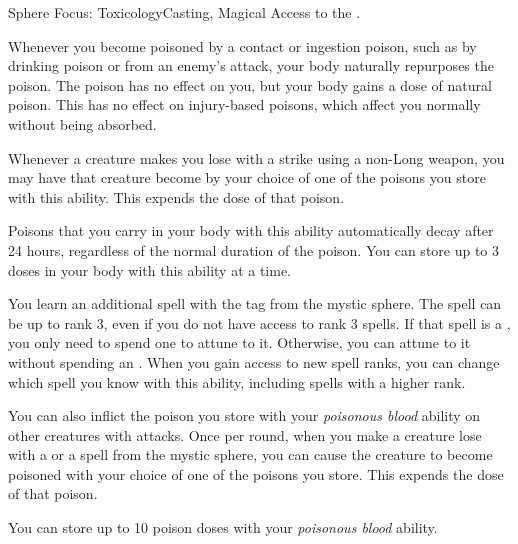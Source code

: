     \begin{magicalfeat}{Sphere Focus: Toxicology}{Casting, Magical}
        \featpre Access to the  .

         Whenever you become poisoned by a contact or ingestion poison, such as by drinking poison or from an enemy's attack, your body naturally repurposes the poison.
        The poison has no effect on you, but your body gains a dose of natural poison.
        This has no effect on injury-based poisons, which affect you normally without being absorbed.

        Whenever a creature makes you lose  with a  strike using a non-Long weapon, you may have that creature become  by your choice of one of the poisons you store with this ability.
        This expends the dose of that poison.

        Poisons that you carry in your body with this ability automatically decay after 24 hours, regardless of the normal duration of the poison.
        You can store up to 3 doses in your body with this ability at a time.

         You learn an additional spell with the  tag from the  mystic sphere.
        The spell can be up to rank 3, even if you do not have access to rank 3 spells.
        If that spell is a , you only need to spend one  to attune to it.
        Otherwise, you can attune to it without spending an .
        When you gain access to new spell ranks, you can change which spell you know with this ability, including spells with a higher rank.

         You can also inflict the poison you store with your \textit{poisonous blood} ability on other creatures with attacks.
        Once per round, when you make a creature lose  with a  or a spell from the  mystic sphere, you can cause the creature to become poisoned with your choice of one of the poisons you store.
        This expends the dose of that poison.

         You can store up to 10 poison doses with your \textit{poisonous blood} ability.
    \end{magicalfeat}

